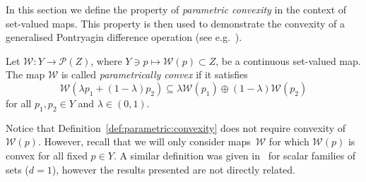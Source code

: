 \documentclass[smallextended]{svjour3}       %
\numberwithin{equation}{section}
\begin{document}
In this section we define the property of \emph{parametric convexity} in the context of set-valued maps. 
%
This property is then used to demonstrate the convexity of a generalised Pontryagin difference operation (see e.g.~\cite{Hadwiger:1950,blanchini:2007}). 
%
%
\begin{definition}\label{def:parametric:convexity}
Let $\mathcal W:Y\rightarrow \mathscr P(Z)$, where $Y\ni p\mapsto \mathcal W(p) \subset Z$, be a continuous set-valued map. The map $\mathcal W$ is called \emph{parametrically convex} if it satisfies
%
  \begin{equation}\label{eq:def:parametrically:convex}
  \mathcal W(\lambda p_1 + (1-\lambda)p_2)\subseteq\lambda \mathcal W(p_1) \oplus (1-\lambda) \mathcal W(p_2)
  \end{equation}
%
  for all $p_1,p_2\in Y$ and $\lambda\in (0,1)$.
\end{definition}
%
Notice that Definition~\ref{def:parametric:convexity} does not require convexity of~$\mathcal W(p)$. 
%
However, recall that we will only consider maps~$\mathcal W$ for which $\mathcal W(p)$ is convex for all fixed $p\in Y$.
%
A similar definition was given in~\cite{Hadwiger:1957} for scalar families of sets ($d=1$), however the results presented are not directly related.
\end{document}
